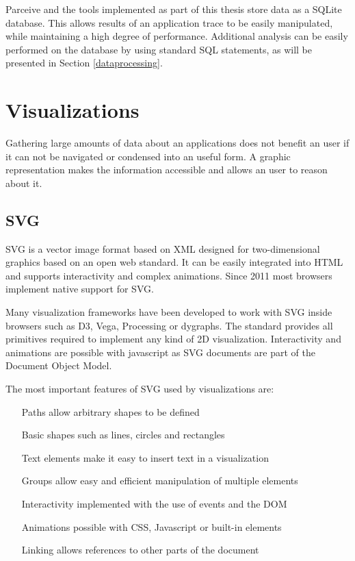 Parceive and the tools implemented as part of this thesis store data as a SQLite database. This allows results of an application trace to be easily manipulated, while maintaining a high degree of performance. Additional analysis can be easily performed on the database by using standard SQL statements, as will be presented in Section \ref{dataprocessing}.

\section {Visualizations}

Gathering large amounts of data about an applications does not benefit an user if it can not be navigated or condensed into an useful form. A graphic representation makes the information accessible and allows an user to reason about it.

\subsection {SVG}

SVG \cite{svg11} is a vector image format based on XML designed for two-dimensional graphics based on an open web standard. It can be easily integrated into HTML and supports interactivity and complex animations. Since 2011 most browsers implement native support for SVG.

Many visualization frameworks have been developed to work with SVG inside browsers such as D3, Vega, Processing or dygraphs. The standard provides all primitives required to implement any kind of 2D visualization. Interactivity and animations are possible with javascript as SVG documents are part of the Document Object Model.

The most important features of SVG used by visualizations are:

\begin{itemize}
	\item[Paths] allow arbitrary shapes to be defined
	\item[Basic shapes] such as lines, circles and rectangles
	\item[Text elements] make it easy to insert text in a visualization
	\item[Groups] allow easy and efficient manipulation of multiple elements
	\item[Interactivity] implemented with the use of events and the DOM
	\item[Animations] possible with CSS, Javascript or built-in elements
	\item[Linking] allows references to other parts of the document
\end{itemize}

